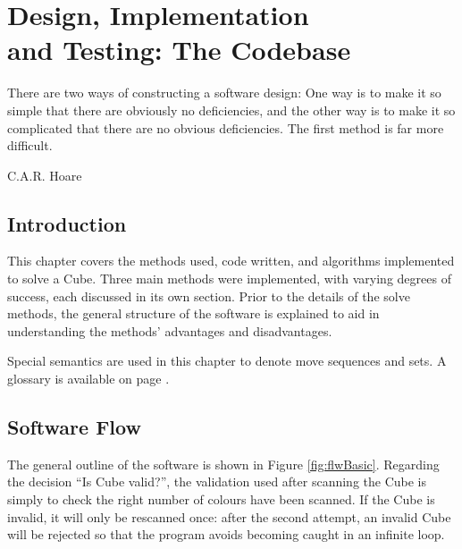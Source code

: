 \documentclass{report}
\begin{document}
    \newpage
    
    \chapter[Design, Implementation and Testing: The Codebase]{Design, Implementation \\ and Testing: The Codebase}
    \epigraph{There are two ways of constructing a software design: One way is to make it so simple that there are obviously no deficiencies, and the other way is to make it so complicated that there are no obvious deficiencies. The first method is far more difficult.}{C.A.R. Hoare \cite{Hoare1981}}
    
    \section{Introduction}
    
	This chapter covers the methods used, code written, and algorithms implemented to solve a Cube. Three main methods were implemented, with varying degrees of success, each discussed in its own section. Prior to the details of the solve methods, the general structure of the software is explained to aid in understanding the methods' advantages and disadvantages.
    
    Special semantics are used in this chapter to denote move sequences and sets. A glossary is available on page \pageref{tab:abbrev}.
    
    \section{Software Flow}
    
    The general outline of the software is shown in Figure \ref{fig:flwBasic}. Regarding the decision \enquote{Is Cube valid?}, the validation used after scanning the Cube is simply to check the right number of colours have been scanned. If the Cube is invalid, it will only be rescanned once: after the second attempt, an invalid Cube will be rejected so that the program avoids becoming caught in an infinite loop.
    
\end{document}
